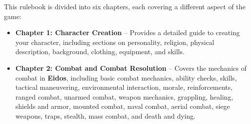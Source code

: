 \documentclass{article}
\begin{document}
This rulebook is divided into six chapters, each covering a different aspect of the game:

\begin{itemize}
    \item \textbf{Chapter 1: Character Creation} – Provides a detailed guide to creating your character, including sections on personality, religion, physical description, background, clothing, equipment, and skills.
    
    \item \textbf{Chapter 2: Combat and Combat Resolution} – Covers the mechanics of combat in \textbf{Eidos}, including basic combat mechanics, ability checks, skills, tactical maneuvering, environmental interaction, morale, reinforcements, ranged combat, unarmed combat, weapon mechanics, grappling, healing, shields and armor, mounted combat, naval combat, aerial combat, siege weapons, traps, stealth, mass combat, and death and dying.
\end{itemize}
\end{document}
